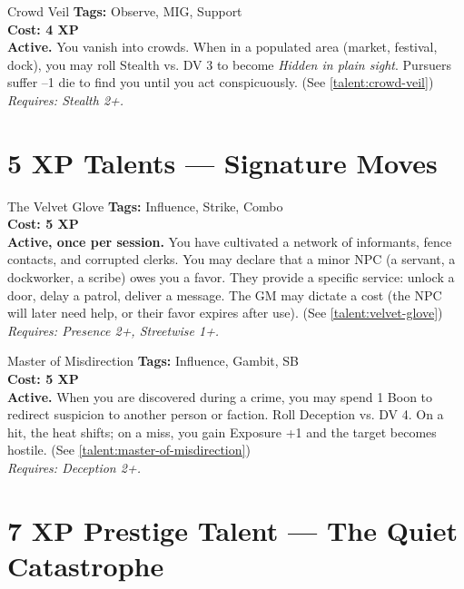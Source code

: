 \documentclass[10pt,twoside]{book}
\begin{document}
\begin{talentbox}{Crowd Veil}
\textbf{Tags:} Observe, MIG, Support \\
\textbf{Cost: 4 XP} \\
\textbf{Active.} You vanish into crowds. When in a populated area (market, festival, dock), you may roll Stealth vs. DV 3 to become \textit{Hidden in plain sight}. Pursuers suffer --1 die to find you until you act conspicuously. (See \ref{talent:crowd-veil}) \\
\textit{Requires: Stealth 2+.}
\end{talentbox}

\section{5 XP Talents --- Signature Moves}

\begin{talentbox}{The Velvet Glove}
\textbf{Tags:} Influence, Strike, Combo \\
\textbf{Cost: 5 XP} \\
\textbf{Active, once per session.} You have cultivated a network of informants, fence contacts, and corrupted clerks. You may declare that a minor NPC (a servant, a dockworker, a scribe) owes you a favor. They provide a specific service: unlock a door, delay a patrol, deliver a message. The GM may dictate a cost (the NPC will later need help, or their favor expires after use). (See \ref{talent:velvet-glove}) \\
\textit{Requires: Presence 2+, Streetwise 1+.}
\end{talentbox}

\begin{talentbox}{Master of Misdirection}
\textbf{Tags:} Influence, Gambit, SB \\
\textbf{Cost: 5 XP} \\
\textbf{Active.} When you are discovered during a crime, you may spend 1 Boon to redirect suspicion to another person or faction. Roll Deception vs. DV 4. On a hit, the heat shifts; on a miss, you gain Exposure +1 and the target becomes hostile. (See \ref{talent:master-of-misdirection}) \\
\textit{Requires: Deception 2+.}
\end{talentbox}

\section{7 XP Prestige Talent --- The Quiet Catastrophe}
\end{document}
